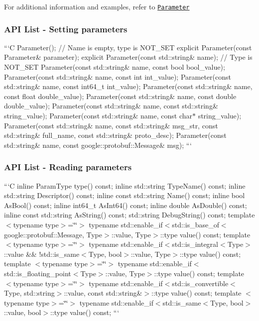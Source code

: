 {\ttfamily For additional information and examples, refer to \href{##param-parameter-service}{\tt Parameter}}

{\ttfamily \subsubsection*{A\-P\-I List -\/ Setting parameters}}

{\ttfamily }

{\ttfamily ```\-C Parameter(); // Name is empty, type is N\-O\-T\-\_\-\-S\-E\-T explicit Parameter(const Parameter\& parameter); explicit Parameter(const std\-::string\& name); // Type is N\-O\-T\-\_\-\-S\-E\-T Parameter(const std\-::string\& name, const bool bool\-\_\-value); Parameter(const std\-::string\& name, const int int\-\_\-value); Parameter(const std\-::string\& name, const int64\-\_\-t int\-\_\-value); Parameter(const std\-::string\& name, const float double\-\_\-value); Parameter(const std\-::string\& name, const double double\-\_\-value); Parameter(const std\-::string\& name, const std\-::string\& string\-\_\-value); Parameter(const std\-::string\& name, const char$\ast$ string\-\_\-value); Parameter(const std\-::string\& name, const std\-::string\& msg\-\_\-str, const std\-::string\& full\-\_\-name, const std\-::string\& proto\-\_\-desc); Parameter(const std\-::string\& name, const google\-::protobuf\-::\-Message\& msg); ```}

{\ttfamily \subsubsection*{A\-P\-I List -\/ Reading parameters}}

{\ttfamily }

{\ttfamily ```\-C inline Param\-Type type() const; inline std\-::string Type\-Name() const; inline std\-::string Descriptor() const; inline const std\-::string Name() const; inline bool As\-Bool() const; inline int64\-\_\-t As\-Int64() const; inline double As\-Double() const; inline const std\-::string As\-String() const; std\-::string Debug\-String() const; template $<$typename type$>$=\char`\"{}\char`\"{}$>$ typename std\-::enable\-\_\-if$<$std\-::is\-\_\-base\-\_\-of$<$google\-::protobuf\-::\-Message, Type$>$\-::value, Type$>$\-::type value() const; template $<$typename type$>$=\char`\"{}\char`\"{}$>$ typename std\-::enable\-\_\-if$<$std\-::is\-\_\-integral$<$\-Type$>$\-::value \&\& !std\-::is\-\_\-same$<$\-Type, bool$>$\-::value, Type$>$\-::type value() const; template $<$typename type$>$=\char`\"{}\char`\"{}$>$ typename std\-::enable\-\_\-if$<$std\-::is\-\_\-floating\-\_\-point$<$\-Type$>$\-::value, Type$>$\-::type value() const; template $<$typename type$>$=\char`\"{}\char`\"{}$>$ typename std\-::enable\-\_\-if$<$std\-::is\-\_\-convertible$<$\-Type, std\-::string$>$\-::value, const std\-::string\&$>$\-::type value() const; template $<$typename type$>$=\char`\"{}\char`\"{}$>$ typename std\-::enable\-\_\-if$<$std\-::is\-\_\-same$<$\-Type, bool$>$\-::value, bool$>$\-::type value() const; ```}

